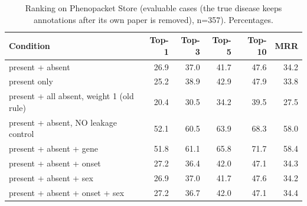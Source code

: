 \begin{table}[t]
\centering\small
\begin{tabular}{lrrrrr}
\toprule
Condition & Top-1 & Top-3 & Top-5 & Top-10 & MRR \\
\midrule
present + absent & 26.9 & 37.0 & 41.7 & 47.6 & 34.2 \\
present only & 25.2 & 38.9 & 42.9 & 47.9 & 33.8 \\
present + all absent, weight 1 (old rule) & 20.4 & 30.5 & 34.2 & 39.5 & 27.5 \\
present + absent, NO leakage control & 52.1 & 60.5 & 63.9 & 68.3 & 58.0 \\
present + absent + gene & 51.8 & 61.1 & 65.8 & 71.7 & 58.4 \\
present + absent + onset & 27.2 & 36.4 & 42.0 & 47.1 & 34.3 \\
present + absent + sex & 26.9 & 37.0 & 41.7 & 47.6 & 34.2 \\
present + absent + onset + sex & 27.2 & 36.7 & 42.0 & 47.1 & 34.4 \\
\bottomrule
\end{tabular}
\caption{Ranking on Phenopacket Store (evaluable cases (the true disease keeps annotations after its own paper is removed), n=357). Percentages.}
\label{tab:rank-main-ev}
\end{table}

